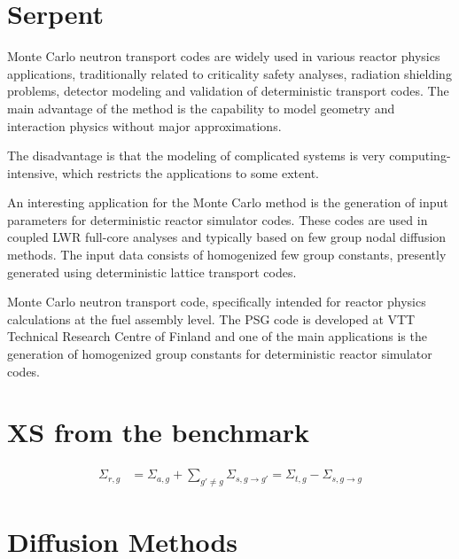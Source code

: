 \documentclass[11pt,letterpaper]{article}
\begin{document}

\section{Serpent}


Monte Carlo neutron transport codes are widely used in various reactor physics
applications, traditionally related to criticality safety analyses, radiation
shielding problems, detector modeling and validation of deterministic transport
codes.
The main advantage of the method is the capability to model geometry and interaction physics without major approximations.

The disadvantage is that the modeling of complicated systems is very computing-intensive, which
restricts the applications to some extent.

An interesting application for the Monte Carlo method is the generation of input parameters for deterministic reactor simulator codes.
These codes are used in coupled LWR full-core analyses and typically based on few group nodal diffusion methods.
The input data consists of homogenized few group constants, presently generated using deterministic lattice transport codes.

Monte Carlo neutron transport code, specifically intended for reactor physics calculations at the fuel assembly level.
The PSG code is developed at VTT Technical Research Centre of Finland and one of the main applications is the generation of homogenized group constants for deterministic reactor simulator codes.

\cite{leppanen_development_2007}

\section{XS from the benchmark}

\begin{align}
\Sigma_{r,g} &= \Sigma_{a,g} + \sum_{g' \ne g} \Sigma_{s,g \rightarrow g'} = \Sigma_{t,g} - \Sigma_{s, g \rightarrow g}
\label{eq:removal}
\end{align}

\section{Diffusion Methods}
\end{document}

